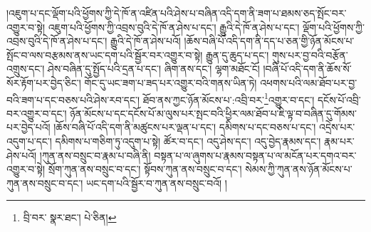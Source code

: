 །འཇུག་པ་དང་ལྡོག་པའི་ཕྱོགས་ཀྱི་དེ་ཁོ་ན་འཛིན་པའི་ཤེས་པ་བཞིན་འདི་དག་ནི་ཟག་པ་ཐམས་ཅད་སྤོང་བར་འགྱུར་བ་སྟེ། འཇུག་པའི་ཕྱོགས་ཀྱི་འབྲས་བུའི་དེ་ཁོ་ན་ཤེས་པ་དང་། རྒྱུའི་དེ་ཁོ་ན་ཤེས་པ་དང་། ལྡོག་པའི་ཕྱོགས་ཀྱི་འབྲས་བུའི་དེ་ཁོ་ན་ཤེས་པ་དང་། རྒྱུའི་དེ་ཁོ་ན་ཤེས་པའོ། །ཆོས་བཞི་པོ་འདི་དག་ནི་དད་པ་ཅན་གྱི་ཉོན་མོངས་པ་སྤོང་བ་ལས་བརྩམས་ནས་ཡང་དག་པའི་སྦྱོར་བར་འགྱུར་བ་སྟེ། རྒྱུན་དུ་ཆུད་པ་དང་། གུས་པར་བྱ་བའི་བརྩོན་འགྲུས་དང་། ཤེས་བཞིན་དུ་སྤྱོད་པའི་དྲན་པ་དང་། ཞིག་ནས་དང་། ལྷག་མཐོང་ངོ། །བཞི་པོ་འདི་དག་ནི་ཆོས་སོ་སོར་རྟོག་པར་བྱེད་ཅིང་། གོང་དུ་ཡང་ཟག་པ་ཟད་པར་འགྱུར་བའི་གནས་ཡིན་ཏེ། འཕགས་པའི་ལམ་ཐོབ་པར་བྱ་བའི་ཟག་པ་དང་བཅས་པའི་ཤེས་རབ་དང་། ཐོབ་ནས་ཀྱང་ཉོན་མོངས་པ་:འབྲི་བར་\footnote{བྲི་བར་  སྣར་ཐང་།  པེ་ཅིན། }འགྱུར་བ་དང་། དངོས་པོ་འབྲི་བར་འགྱུར་བ་དང་། ཉོན་མོངས་པ་དང་དངོས་པོ་མ་ལུས་པར་སྤང་བའི་ཕྱིར་ལམ་ཐོབ་པ་ཇི་ལྟ་བ་བཞིན་དུ་གོམས་པར་བྱེད་པའོ། །ཆོས་བཞི་པོ་འདི་དག་ནི་མཚུངས་པར་ལྡན་པ་དང་། དམིགས་པ་དང་བཅས་པ་དང་། འདྲེས་པར་འདུག་པ་དང་། དམིགས་པ་གཅིག་ཏུ་འདུག་པ་སྟེ། ཚོར་བ་དང་། འདུ་ཤེས་དང་། འདུ་བྱེད་རྣམས་དང་། རྣམ་པར་ཤེས་པའོ། །ཀུན་ནས་བསྲུང་བ་རྣམ་པ་བཞི་ནི། བསྟན་པ་ལ་ཞུགས་པ་རྣམས་བསྟན་པ་ལ་མངོན་པར་དགའ་བར་འགྱུར་བ་སྟེ། སྲོག་ཀུན་ནས་བསྲུང་བ་དང་། སྟོབས་ཀུན་ནས་བསྲུང་བ་དང་། སེམས་ཀྱི་ཀུན་ནས་ཉོན་མོངས་པ་ཀུན་ནས་བསྲུང་བ་དང་། ཡང་དག་པའི་སྦྱོར་བ་ཀུན་ནས་བསྲུང་བའོ། །
